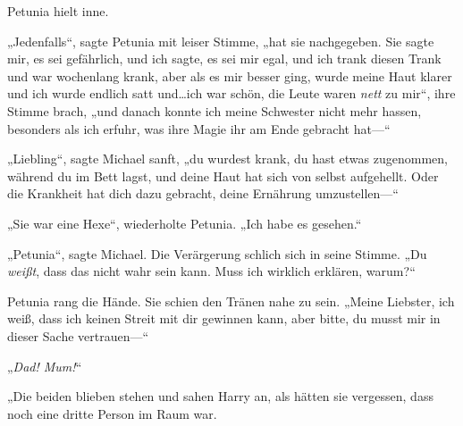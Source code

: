 Petunia hielt inne.

„Jedenfalls“, sagte Petunia mit leiser Stimme, „hat sie nachgegeben. Sie sagte mir, es sei gefährlich, und ich sagte, es sei mir egal, und ich trank diesen Trank und war wochenlang krank, aber als es mir besser ging, wurde meine Haut klarer und ich wurde endlich satt und…ich war schön, die Leute waren \emph{nett} zu mir“, ihre Stimme brach, „und danach konnte ich meine Schwester nicht mehr hassen, besonders als ich erfuhr, was ihre Magie ihr am Ende gebracht hat—“

„Liebling“, sagte Michael sanft, „du wurdest krank, du hast etwas zugenommen, während du im Bett lagst, und deine Haut hat sich von selbst aufgehellt. Oder die Krankheit hat dich dazu gebracht, deine Ernährung umzustellen—“

„Sie war eine Hexe“, wiederholte Petunia. „Ich habe es gesehen.“

„Petunia“, sagte Michael. Die Verärgerung schlich sich in seine Stimme. „Du \emph{weißt}, dass das nicht wahr sein kann. Muss ich wirklich erklären, warum?“

Petunia rang die Hände. Sie schien den Tränen nahe zu sein. „Meine Liebster, ich weiß, dass ich keinen Streit mit dir gewinnen kann, aber bitte, du musst mir in dieser Sache vertrauen—“

„\emph{Dad! Mum!}“

„Die beiden blieben stehen und sahen Harry an, als hätten sie vergessen, dass noch eine dritte Person im Raum war.

